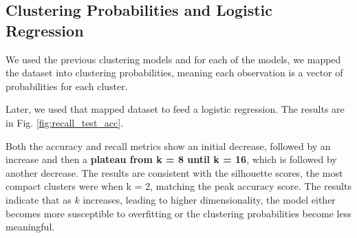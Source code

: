\documentclass[a4paper,12pt]{article}
\begin{document}
\subsection{Clustering Probabilities and Logistic Regression}
We used the previous clustering models and for each of the models, we mapped the dataset into clustering probabilities, meaning each observation is a vector of probabilities for each cluster.

Later, we used that mapped dataset to feed a logistic regression. The results are in Fig. \ref{fig:recall_test_acc}.

Both the accuracy and recall metrics show an initial decrease, followed by an increase and then a \textbf{plateau from k = 8 until k = 16}, which is followed by another decrease. The results are consistent with the silhouette scores, the most compact clusters were when k = 2, matching the peak accuracy score. The results indicate that as \( k \) increases, leading to higher dimensionality, the model either becomes more susceptible to overfitting or the clustering probabilities become less meaningful.
\end{document}

